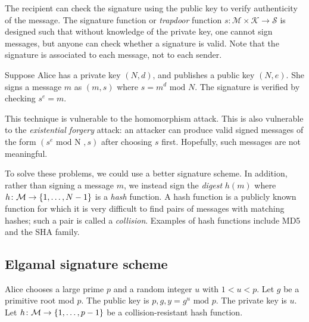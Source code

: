 The recipient can check the signature using the public key to verify authenticity of the message.
The signature function or \emph{trapdoor} function \( s \colon \mathcal M \times \mathcal K \to \mathcal S \) is designed such that without knowledge of the private key, one cannot sign messages, but anyone can check whether a signature is valid.
Note that the signature is associated to each message, not to each sender.
\begin{example}
    Suppose Alice has a private key \( (N, d) \), and publishes a public key \( (N, e) \).
    She signs a message \( m \) as \( (m, s) \) where \( s = m^d \text{ mod } N \).
    The signature is verified by checking \( s^e = m \).

    This technique is vulnerable to the homomorphism attack.
    This is also vulnerable to the \emph{existential forgery} attack: an attacker can produce valid signed messages of the form \( (s^e \text{ mod N }, s) \) after choosing \( s \) first.
    Hopefully, such messages are not meaningful.

    To solve these problems, we could use a better signature scheme.
    In addition, rather than signing a message \( m \), we instead sign the \emph{digest} \( h(m) \) where \( h \colon \mathcal M \to \qty{1, \dots, N-1} \) is a \emph{hash} function.
    A hash function is a publicly known function for which it is very difficult to find pairs of messages with matching hashes; such a pair is called a \emph{collision}.
    Examples of hash functions include MD5 and the SHA family.
\end{example}

\subsection{Elgamal signature scheme}
Alice chooses a large prime \( p \) and a random integer \( u \) with \( 1 < u < p \).
Let \( g \) be a primitive root mod \( p \).
The public key is \( p, g, y = g^u \text{ mod } p \).
The private key is \( u \).
Let \( h \colon \mathcal M \to \qty{1, \dots, p-1} \) be a collision-resistant hash function.

